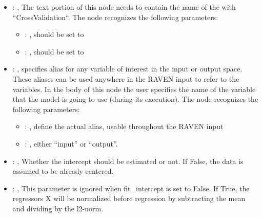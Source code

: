 \begin{itemize}
    \item {}: , 
      The text portion of this node needs to contain the name of the  with
               ``CrossValidation``.
      The  node recognizes the following parameters:
        \begin{itemize}
          \item {}: , 
            should be set to 
          \item {}: , 
            should be set to 
      \end{itemize}

    \item {}: , 
      specifies alias for         any variable of interest in the input or output space. These
      aliases can be used anywhere in the RAVEN input to         refer to the variables. In the body
      of this node the user specifies the name of the variable that the model is going to use
      (during its execution).
      The  node recognizes the following parameters:
        \begin{itemize}
          \item {}: , 
            define the actual alias, usable throughout the RAVEN input
          \item {}: , 
            either ``input'' or ``output''.
      \end{itemize}

    \item {}: , 
      Whether the intercept should be estimated or not. If False,
      the data is assumed to be already centered.

    \item {}: , 
      This parameter is ignored when fit\_intercept is set to False. If True,
      the regressors X will be normalized before regression by subtracting the mean and
      dividing by the l2-norm.
  \end{itemize}


